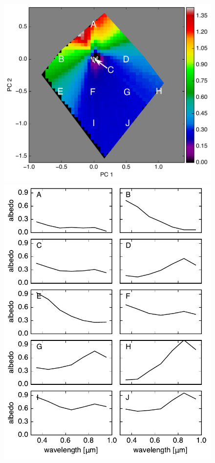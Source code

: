 \documentclass[iop,numberedappendix,apj,]{emulateapj}
\begin{document}
\begin{figure}[tbh!]
    \begin{center}
	\includegraphics[width=\hsize]{raddata_2_PCplane_noreg_labels.pdf}
	\includegraphics[width=\hsize]{raddata_2_norm_spectra.pdf}

\end{center}
\end{figure}
\end{document}
